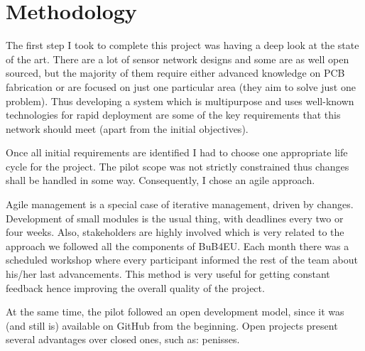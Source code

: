 
\chapter{Methodology} %

\label{Chapter4} %



The first step I took to complete this project was having a deep look at the state of the art. There are a lot of sensor network designs and some are as well open sourced, but the majority of them require either advanced knowledge on PCB fabrication or are focused on just one particular area (they aim to solve just one problem). Thus developing a system which is multipurpose and uses well-known technologies for rapid deployment are some of the key requirements that this network should meet (apart from the initial objectives).

Once all initial requirements are identified I had to choose one appropriate life cycle for the project. The pilot scope was not strictly constrained thus changes shall be handled in some way. Consequently, I chose an agile\citep{} approach.

Agile management is a special case of iterative management, driven by changes\citep{pmbok_agile}. Development of small modules is the usual thing, with deadlines every two or four weeks. Also, stakeholders are highly involved which is very related to the approach we followed all the components of BuB4EU. Each month there was a scheduled workshop where every participant informed the rest of the team about his/her last advancements. This method is very useful for getting constant feedback hence improving the overall quality of the project.

At the same time, the pilot followed an open development model, since it was (and still is) available on GitHub from the beginning. Open projects present several advantages over closed ones\citep{}, such as: penisses.
